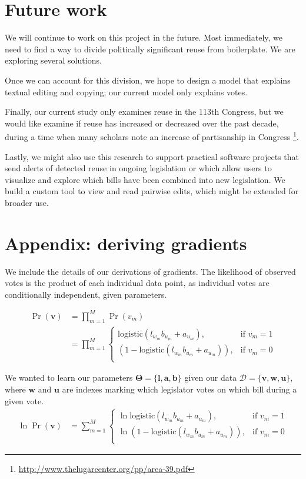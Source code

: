 \documentclass{article}
\newcommand\logistic{\text{logistic}}
\newcommand\data{\boldsymbol{\mathcal{D}}}
\begin{document}
\section{Future work}\label{sec:future}

We will continue to work on this project in the future. Most immediately, we need to find a way to divide politically significant reuse from boilerplate. We are exploring several solutions.

Once we can account for this division, we hope to design a model that explains textual editing and copying; our current model only explains votes.

Finally, our current study only examines reuse in the 113th Congress, but we would like examine if reuse has increased or decreased over the past decade, during a time when many scholars note an increase of partisanship in Congress 
\footnote{\url{http://www.thelugarcenter.org/pp/area-39.pdf}}.

Lastly, we might also use this research to support practical software projects that send alerts of detected reuse in ongoing legislation or which allow users to visualize and explore which bills have been combined into new legislation. We build a custom tool to view and read pairwise edits, which might be extended for broader use.

\section{Appendix: deriving gradients}\label{sec:appendix}

We include the details of our derivations of gradients. The likelihood of observed votes is the product of each individual data point, as individual votes are conditionally independent, given parameters.

\begin{align*}
    \Pr (\boldsymbol{v}) &= \prod_{m=1}^M \Pr(v_m) \\
    &= \prod_{m=1}^M \begin{cases}
            \logistic(l_{w_m}  b_{u_m} +  a_{u_m}),& \text{if } v_m = 1\\
            (1 - \logistic(l_{w_m}  b_{u_m} +  a_{u_m})),              & \text{if } v_m = 0\\
        \end{cases}
\end{align*}

We wanted to learn our parameters $\boldsymbol{\Theta} = \{\boldsymbol{l}, \boldsymbol{a}, \boldsymbol{b}\}$ given our data $\data=\{\boldsymbol{v}, \boldsymbol{w}, \boldsymbol{u}\}$, where $\boldsymbol{w}$ and  $\boldsymbol{u}$ are indexes marking which legislator votes on which bill during a given vote. 
\begin{align*}
    \ln \Pr (\boldsymbol{v})
    &= \sum_{m=1}^M \begin{cases}
            \ln \logistic(l_{w_m}  b_{u_m} +  a_{u_m}),& \text{if } v_m = 1\\
            \ln (1 - \logistic(l_{w_m}  b_{u_m} +  a_{u_m})),              & \text{if } v_m = 0\\
        \end{cases}
\end{align*}
\end{document}
